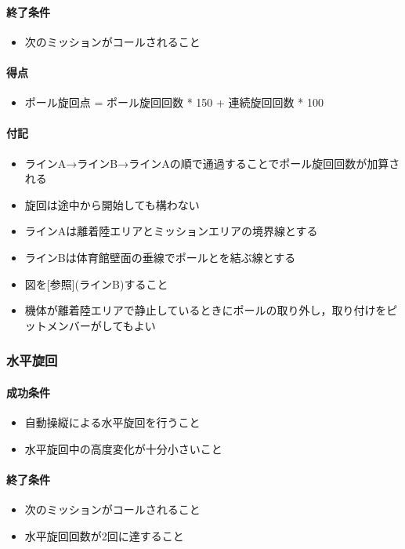 \paragraph{終了条件}
\begin{itemize}
\item 次のミッションがコールされること
\end{itemize}
\paragraph{得点}
\begin{itemize}
\item ポール旋回点 = ポール旋回回数 * 150 + 連続旋回回数 * 100
\end{itemize}
\paragraph{付記}
\begin{itemize}
\item ラインA→ラインB→ラインAの順で通過することでポール旋回回数が加算される
\item 旋回は途中から開始しても構わない
\item ラインAは離着陸エリアとミッションエリアの境界線とする
\item ラインBは体育館壁面の垂線でポールとを結ぶ線とする
  \item 図を[参照](ラインB)すること
\item 機体が離着陸エリアで静止しているときにポールの取り外し，取り付けをピットメンバーがしてもよい
\end{itemize}
\subsubsection{水平旋回}
\paragraph{成功条件}
\begin{itemize}
\item 自動操縦による水平旋回を行うこと
\item 水平旋回中の高度変化が十分小さいこと
\end{itemize}
\paragraph{終了条件}
\begin{itemize}
\item 次のミッションがコールされること
\item 水平旋回回数が2回に達すること
\end{itemize}

